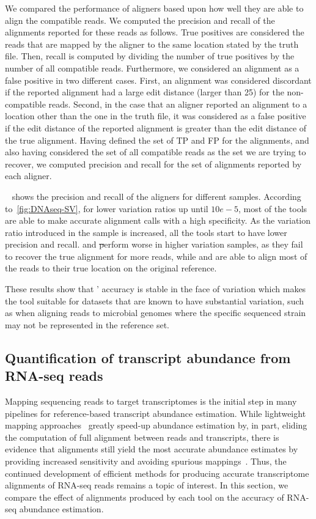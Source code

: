 We compared the performance of aligners based upon how well they are able to align the compatible reads. We computed the precision and recall of the alignments reported for these reads as follows. True positives are considered the reads that are mapped by the aligner to the same location stated by the truth file. Then, recall is computed by dividing the number of true positives by the number of all compatible reads. Furthermore, we considered an alignment as a false positive in two different cases. First, an alignment was considered discordant if the reported alignment had a large edit distance (larger than 25) for the non-compatible reads. Second, in the case that an aligner reported an alignment to a location other than the one in the truth file, it was considered as a false positive if the edit distance of the reported alignment is greater than the edit distance of the true alignment. Having defined the set of TP and FP for the alignments, and also having considered the set of all compatible reads as the set we are trying to recover, we computed precision and recall for the set of alignments reported by each aligner.

~ shows the precision and recall of the aligners for different samples. 
According to~\cref{fig:DNAseq-SV}, for lower variation ratios up until $10e-5$, most of the tools are 
able to make accurate alignment calls with a high specificity. As the variation ratio introduced in the 
sample is increased, all the tools start to have lower precision and recall.
\debga and \st perform worse in higher variation samples, as they fail to recover the true alignment for more 
reads, while \bt and \puffaligner are able to align most of the reads to their true 
location on the original reference.

These results show that \puffaligner' accuracy is stable in the face of variation which makes the tool 
suitable for datasets that are known to have substantial variation, such as when aligning reads to 
microbial genomes where the specific sequenced strain may not be represented in the reference set.

\subsection{Quantification of transcript abundance from RNA-seq reads}

Mapping sequencing reads to target transcriptomes is the initial step in many pipelines for reference-based 
transcript abundance estimation. While lightweight mapping approaches~\citep{kallisto,salmon} greatly speed-up 
abundance estimation by, in part, eliding the computation of full alignment between reads and transcripts, 
there is evidence that alignments still yield the most accurate abundance estimates by providing increased 
sensitivity and avoiding spurious mappings~\citep{selaln,revisit,srivastava2019alignment}. Thus, the continued 
development of efficient methods for producing accurate transcriptome alignments of RNA-seq reads remains a 
topic of interest. In this section, we compare the effect of alignments produced by each tool on the accuracy 
of RNA-seq abundance estimation.  

